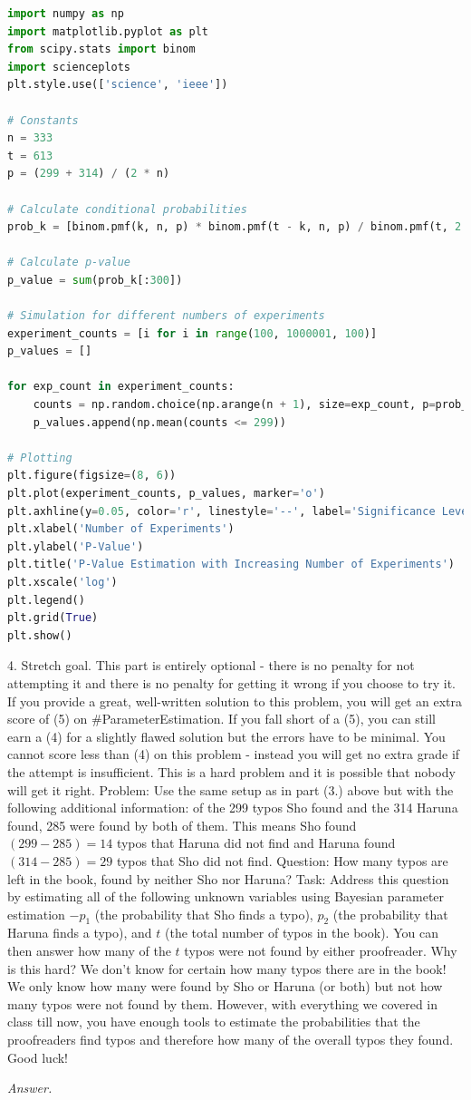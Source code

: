 \documentclass[12pt]{article}
\begin{document}
\begin{lstlisting}[language=Python]
import numpy as np
import matplotlib.pyplot as plt
from scipy.stats import binom
import scienceplots
plt.style.use(['science', 'ieee'])

# Constants
n = 333
t = 613
p = (299 + 314) / (2 * n)

# Calculate conditional probabilities
prob_k = [binom.pmf(k, n, p) * binom.pmf(t - k, n, p) / binom.pmf(t, 2 * n, p) for k in range(n + 1)]

# Calculate p-value
p_value = sum(prob_k[:300])

# Simulation for different numbers of experiments
experiment_counts = [i for i in range(100, 1000001, 100)]
p_values = []

for exp_count in experiment_counts:
    counts = np.random.choice(np.arange(n + 1), size=exp_count, p=prob_k)
    p_values.append(np.mean(counts <= 299))

# Plotting
plt.figure(figsize=(8, 6))
plt.plot(experiment_counts, p_values, marker='o')
plt.axhline(y=0.05, color='r', linestyle='--', label='Significance Level (0.05)')
plt.xlabel('Number of Experiments')
plt.ylabel('P-Value')
plt.title('P-Value Estimation with Increasing Number of Experiments')
plt.xscale('log')
plt.legend()
plt.grid(True)
plt.show()
\end{lstlisting}

\begin{q}
4. Stretch goal. This part is entirely optional - there is no penalty for not attempting it and there is no penalty for getting it wrong if you choose to try it. If you provide a great, well-written solution to this problem, you will get an extra score of (5) on \#ParameterEstimation. If you fall short of a (5), you can still earn a (4) for a slightly flawed solution but the errors have to be minimal. You cannot score less than (4) on this problem - instead you will get no extra grade if the attempt is insufficient. This is a hard problem and it is possible that nobody will get it right.
Problem: Use the same setup as in part (3.) above but with the following additional information: of the 299 typos Sho found and the 314 Haruna found, 285 were found by both of them. This means Sho found \((299-285)=14\) typos that Haruna did not find and Haruna found \((314-285)=29\) typos that Sho did not find.
Question: How many typos are left in the book, found by neither Sho nor Haruna?
Task: Address this question by estimating all of the following unknown variables using Bayesian parameter estimation \(-p_1\) (the probability that Sho finds a typo), \(p_2\) (the probability that Haruna finds a typo), and \(t\) (the total number of typos in the book). You can then answer how many of the \(t\) typos were not found by either proofreader.
Why is this hard? We don't know for certain how many typos there are in the book! We only know how many were found by Sho or Haruna (or both) but not how many typos were not found by them. However, with everything we covered in class till now, you have enough tools to estimate the probabilities that the proofreaders find typos and therefore how many of the overall typos they found. Good luck!
\end{q}
\textit{Answer.}
\end{document}
